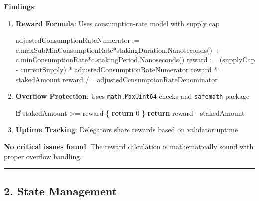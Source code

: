 \documentclass[
]{article}
\newenvironment{Shaded}{}{}
\newcommand{\ControlFlowTok}[1]{\textcolor[rgb]{0.00,0.44,0.13}{\textbf{#1}}}
\newcommand{\DecValTok}[1]{\textcolor[rgb]{0.25,0.63,0.44}{#1}}
\newcommand{\NormalTok}[1]{#1}
\newcommand{\OperatorTok}[1]{\textcolor[rgb]{0.40,0.40,0.40}{#1}}
\begin{document}
\textbf{Findings}:

\begin{enumerate}
\def\labelenumi{\arabic{enumi}.}
\item
  \textbf{Reward Formula}: Uses consumption-rate model with supply cap

\begin{Shaded}
\begin{Highlighting}[]
\NormalTok{adjustedConsumptionRateNumerator }\OperatorTok{:=}\NormalTok{ c}\OperatorTok{.}\NormalTok{maxSubMinConsumptionRate}\OperatorTok{*}\NormalTok{stakingDuration}\OperatorTok{.}\NormalTok{Nanoseconds}\OperatorTok{()} \OperatorTok{+}
\NormalTok{    c}\OperatorTok{.}\NormalTok{minConsumptionRate}\OperatorTok{*}\NormalTok{c}\OperatorTok{.}\NormalTok{stakingPeriod}\OperatorTok{.}\NormalTok{Nanoseconds}\OperatorTok{()}
\NormalTok{reward }\OperatorTok{:=} \OperatorTok{(}\NormalTok{supplyCap }\OperatorTok{{-}}\NormalTok{ currentSupply}\OperatorTok{)} \OperatorTok{*}\NormalTok{ adjustedConsumptionRateNumerator}
\NormalTok{reward }\OperatorTok{*=}\NormalTok{ stakedAmount}
\NormalTok{reward }\OperatorTok{/=}\NormalTok{ adjustedConsumptionRateDenominator}
\end{Highlighting}
\end{Shaded}
\item
  \textbf{Overflow Protection}: Uses \texttt{math.MaxUint64} checks and
  \texttt{safemath} package

\begin{Shaded}
\begin{Highlighting}[]
\ControlFlowTok{if}\NormalTok{ stakedAmount }\OperatorTok{\textgreater{}=}\NormalTok{ reward }\OperatorTok{\{}
    \ControlFlowTok{return} \DecValTok{0}
\OperatorTok{\}}
\ControlFlowTok{return}\NormalTok{ reward }\OperatorTok{{-}}\NormalTok{ stakedAmount}
\end{Highlighting}
\end{Shaded}
\item
  \textbf{Uptime Tracking}: Delegators share rewards based on validator
  uptime
\end{enumerate}

\textbf{No critical issues found}. The reward calculation is
mathematically sound with proper overflow handling.

\begin{center}\rule{0.5\linewidth}{0.5pt}\end{center}

\subsection{2. State Management}\label{2-state-management}
\end{document}
